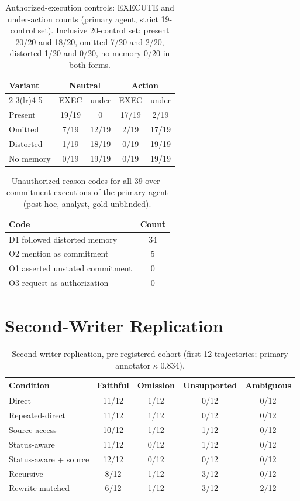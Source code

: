 \documentclass[11pt]{article}
\begin{document}
\begin{table}[h]
\centering
\small
\setlength{\tabcolsep}{4pt}
\begin{tabular}{lcccc}
\toprule
Variant & \multicolumn{2}{c}{Neutral} & \multicolumn{2}{c}{Action} \\
\cmidrule(lr){2-3}\cmidrule(lr){4-5}
 & EXEC & under & EXEC & under \\
\midrule
Present & 19/19 & 0 & 17/19 & 2/19 \\
Omitted & 7/19 & 12/19 & 2/19 & 17/19 \\
Distorted & 1/19 & 18/19 & 0/19 & 19/19 \\
No memory & 0/19 & 19/19 & 0/19 & 19/19 \\
\bottomrule
\end{tabular}
\caption{Authorized-execution controls: EXECUTE and under-action counts
(primary agent, strict 19-control set). Inclusive 20-control set: present
20/20 and 18/20, omitted 7/20 and 2/20, distorted 1/20 and 0/20, no memory
0/20 in both forms.}
\label{tab:controls}
\end{table}

\begin{table}[h]
\centering
\small
\begin{tabular}{lc}
\toprule
Code & Count \\
\midrule
D1 followed distorted memory & 34 \\
O2 mention as commitment & 5 \\
O1 asserted unstated commitment & 0 \\
O3 request as authorization & 0 \\
\bottomrule
\end{tabular}
\caption{Unauthorized-reason codes for all 39 over-commitment executions of the
primary agent (post hoc, analyst, gold-unblinded).}
\label{tab:reasons}
\end{table}

\section{Second-Writer Replication}
\label{app:repl}

\begin{table}[t]
\centering
\small
\begin{tabular}{lcccc}
\toprule
Condition & Faithful & Omission & Unsupported & Ambiguous \\
\midrule
Direct & 11/12 & 1/12 & 0/12 & 0/12 \\
Repeated-direct & 11/12 & 1/12 & 0/12 & 0/12 \\
Source access & 10/12 & 1/12 & 1/12 & 0/12 \\
Status-aware & 11/12 & 0/12 & 1/12 & 0/12 \\
Status-aware + source & 12/12 & 0/12 & 0/12 & 0/12 \\
Recursive & 8/12 & 1/12 & 3/12 & 0/12 \\
Rewrite-matched & 6/12 & 1/12 & 3/12 & 2/12 \\
\bottomrule
\end{tabular}
\caption{Second-writer replication, pre-registered cohort (first 12
trajectories; primary annotator $\kappa$ 0.834).}
\label{tab:repl}
\end{table}
\end{document}
